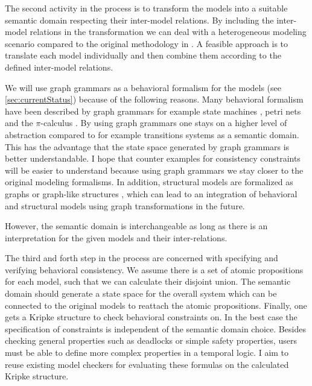 \documentclass[conference]{IEEEtran}
\begin{document}
The second activity in the process is to transform the models into a suitable semantic domain respecting their inter-model relations.
By including the inter-model relations in the transformation we can deal with a heterogeneous modeling scenario compared to the original methodology in \cite{engelsMethodologySpecifyingAnalyzing2001}.
A feasible approach is to translate each model individually and then combine them according to the defined inter-model relations.

We will use graph grammars as a behavioral formalism for the models (see \autoref{sec:currentStatus}) because of the following reasons.
Many behavioral formalism have been described by graph grammars for example state machines \cite{kuskeFormalSemanticsUML2001, varroFormalSemanticsUML2002}, petri nets \cite{ehrigGraphGrammarsPetri2004} and the $\pi$-calculus \cite{gadducciGraphRewritingPcalculus2007}.
By using graph grammars one stays on a higher level of abstraction compared to for example transitions systems as a semantic domain.
This has the advantage that the state space generated by graph grammars is better understandable.
I hope that counter examples for consistency constraints will be easier to understand because using graph grammars we stay closer to the original modeling formalisms.
In addition, structural models are formalized as graphs or graph-like structures \cite{stunkelMultipleModelSynchronization2020}, which can lead to an integration of behavioral and structural models using graph transformations in the future. 

However, the semantic domain is interchangeable as long as there is an interpretation for the given models and their inter-relations.

The third and forth step in the process are concerned with specifying and verifying behavioral consistency.
We assume there is a set of atomic propositions for each model, such that we can calculate their disjoint union.
The semantic domain should generate a state space for the overall system which can be connected to the original models to reattach the atomic propositions.
Finally, one gets a Kripke structure to check behavioral constraints on.
In the best case the specification of constraints is independent of the semantic domain choice.
Besides checking general properties such as deadlocks or simple safety properties, users must be able to define more complex properties in a temporal logic.
I aim to reuse existing model checkers for evaluating these formulas on the calculated Kripke structure.
\end{document}
